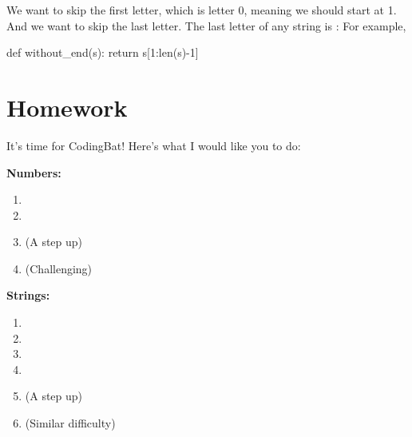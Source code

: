 \documentclass[12pt]{scrartcl}
\begin{document}
We want to skip the first letter, which is letter 0, meaning we should start at 1. And we want to skip the last letter. The last letter of any string is : For example, 
\begin{python}
    def without_end(s):
        return s[1:len(s)-1]
\end{python}

\section{Homework}
It's time for CodingBat! Here's what I would like you to do:

\textbf{Numbers:}
\begin{enumerate}
    \item {}
    \item {}
    \item (A step up) 
    \item (Challenging) 
\end{enumerate}

\medskip

\textbf{Strings:}
\begin{enumerate}
    \item {} 
    \item {}
    \item {}
    \item {}
    \item (A step up) 
    \item (Similar difficulty)  
\end{enumerate}
\end{document}
